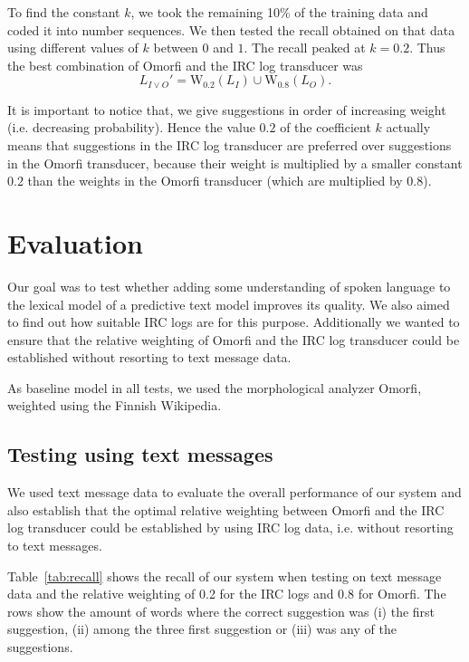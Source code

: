 \documentclass[a4paper,conference]{IEEEtran}
\begin{document}
To find the constant $k$, we took the remaining 10\% of the training
data and coded it into number sequences. We then tested the recall
obtained on that data using different values of $k$ between $0$ and
$1$. The recall peaked at $k = 0.2$. Thus the best combination of Omorfi and the IRC log transducer was
\begin{equation}L_{I\vee O}' = \mathrm{W}_{0.2}(L_I) \cup \mathrm{W}_{0.8}(L_O)\text{.}\end{equation}

It is important to notice that, we give suggestions in order of
increasing weight (i.e. decreasing probability). Hence the value $0.2$
of the coefficient $k$ actually means that suggestions in the IRC log
transducer are preferred over suggestions in the Omorfi transducer,
because their weight is multiplied by a smaller constant $0.2$ than
the weights in the Omorfi transducer (which are multiplied by $0.8$).

\section{Evaluation}
\label{sec:evaluation}

Our goal was to test whether adding some understanding of spoken
language to the lexical model of a predictive text model improves its
quality. We also aimed to find out how suitable IRC logs are for this
purpose. Additionally we wanted to ensure that the relative weighting
of Omorfi and the IRC log transducer could be established without
resorting to text message data. 

As baseline model in all tests, we used the morphological analyzer
Omorfi, weighted using the Finnish Wikipedia.


\subsection{Testing using text messages}
 
We used text message data to evaluate the overall performance of our
system and also establish that the optimal relative weighting between
Omorfi and the IRC log transducer could be established by using IRC
log data, i.e. without resorting to text messages.

Table~\ref{tab:recall} shows the recall of our system when testing on
text message data and the relative weighting of 0.2 for the IRC logs
and 0.8 for Omorfi. The rows show the amount of words where the
correct suggestion was (i) the first suggestion, (ii) among the three
first suggestion or (iii) was any of the suggestions.
\end{document}
